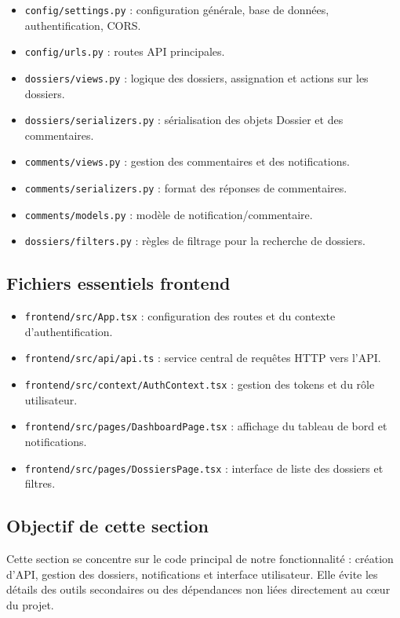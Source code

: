 \documentclass[12pt,a4paper]{article}
\begin{document}
\begin{itemize}
    \item \texttt{config/settings.py} : configuration générale, base de données, authentification, CORS.
    \item \texttt{config/urls.py} : routes API principales.
    \item \texttt{dossiers/views.py} : logique des dossiers, assignation et actions sur les dossiers.
    \item \texttt{dossiers/serializers.py} : sérialisation des objets Dossier et des commentaires.
    \item \texttt{comments/views.py} : gestion des commentaires et des notifications.
    \item \texttt{comments/serializers.py} : format des réponses de commentaires.
    \item \texttt{comments/models.py} : modèle de notification/commentaire.
    \item \texttt{dossiers/filters.py} : règles de filtrage pour la recherche de dossiers.
\end{itemize}

\subsection{Fichiers essentiels frontend}

\begin{itemize}
    \item \texttt{frontend/src/App.tsx} : configuration des routes et du contexte d'authentification.
    \item \texttt{frontend/src/api/api.ts} : service central de requêtes HTTP vers l'API.
    \item \texttt{frontend/src/context/AuthContext.tsx} : gestion des tokens et du rôle utilisateur.
    \item \texttt{frontend/src/pages/DashboardPage.tsx} : affichage du tableau de bord et notifications.
    \item \texttt{frontend/src/pages/DossiersPage.tsx} : interface de liste des dossiers et filtres.
\end{itemize}

\subsection{Objectif de cette section}

Cette section se concentre sur le code principal de notre fonctionnalité : création d'API, gestion des dossiers, notifications et interface utilisateur. Elle évite les détails des outils secondaires ou des dépendances non liées directement au cœur du projet.
\end{document}
